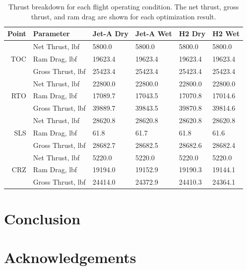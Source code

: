 \documentclass[conf]{new-aiaa}
\begin{document}
\begin{table}[hbt!]
    \centering
    \caption{Thrust breakdown for each flight operating condition.
        The net thrust, gross thrust, and ram drag are shown for each optimization result.
    }
    \small
    \renewcommand{\arraystretch}{1.2}
    \begin{tabular}{r l l l l l}
        Point & Parameter              & Jet-A Dry & Jet-A Wet & H2 Dry  & H2 Wet  \\
        \toprule
              & Net Thrust, \si{lbf}   & 5800.0    & 5800.0    & 5800.0  & 5800.0  \\
        TOC   & Ram Drag, \si{lbf}     & 19623.4   & 19623.4   & 19623.4 & 19623.4 \\
              & Gross Thrust, \si{lbf} & 25423.4   & 25423.4   & 25423.4 & 25423.4 \\
        \hline
              & Net Thrust, \si{lbf}   & 22800.0   & 22800.0   & 22800.0 & 22800.0 \\
        RTO   & Ram Drag, \si{lbf}     & 17089.7   & 17043.5   & 17070.8 & 17014.6 \\
              & Gross Thrust, \si{lbf} & 39889.7   & 39843.5   & 39870.8 & 39814.6 \\
        \hline
              & Net Thrust, \si{lbf}   & 28620.8   & 28620.8   & 28620.8 & 28620.8 \\
        SLS   & Ram Drag, \si{lbf}     & 61.8      & 61.7      & 61.8    & 61.6    \\
              & Gross Thrust, \si{lbf} & 28682.7   & 28682.5   & 28682.6 & 28682.4 \\
        \hline
              & Net Thrust, \si{lbf}   & 5220.0    & 5220.0    & 5220.0  & 5220.0  \\
        CRZ   & Ram Drag, \si{lbf}     & 19194.0   & 19152.9   & 19190.3 & 19144.1 \\
              & Gross Thrust, \si{lbf} & 24414.0   & 24372.9   & 24410.3 & 24364.1 \\
        \bottomrule
    \end{tabular}
    \label{tab:thrust}
\end{table}


\section{Conclusion}
\label{sec:conc}

\section{Acknowledgements}


\end{document}
